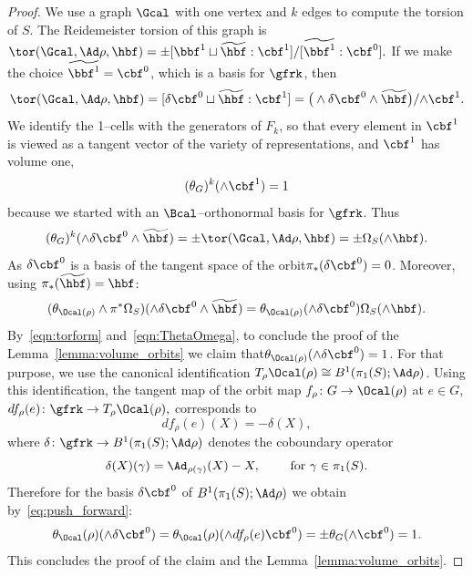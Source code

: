 \begin{proof}
We use a graph $\Gcal$ with one vertex and $k$ edges to compute the torsion of $S$. The Reidemeister torsion of this graph is $
\tor(\Gcal,\Ad\rho, \hbf)= \pm { [{\bbf^1}\sqcup \widetilde{\hbf}: \cbf^1]}/{ [\widetilde{\bbf^1} : \cbf^0] }. $ If we make the choice $\widetilde{\bbf^1}=\cbf^0$, which is a basis for $\gfrk$, then
\[
\tor(\Gcal,\Ad\rho, \hbf)= { [\delta{\cbf^0}\sqcup \widetilde{\hbf}: \cbf^1]} = \big(\wedge\delta{\cbf^0}\wedge \widetilde{\hbf}\big) \slash {\wedge\cbf^1}.
\]
We identify the 1--cells with the generators of $F_k$, so that every element in $\cbf^1$ is viewed as a tangent vector of the variety of representations, and $\cbf^1$ has volume one,
\[
(\theta_G)^{k} (\wedge \cbf^1) = 1
\]
because we started with an $\Bcal$--orthonormal basis for $\gfrk$. Thus
\begin{equation}\label{eqn:torform}
(\theta_G)^{k} (\wedge\delta{\cbf^0}\wedge \widetilde{\hbf})=\pm
\tor(\Gcal,{\Ad\rho, \hbf})= \pm \Omega_S(\wedge \hbf).
\end{equation}
As $\delta\cbf^0$ is a basis of the tangent space of the orbit$\pi_*(\delta\cbf^0)=0$. Moreover, using $\pi_*(\widetilde{\hbf})= \hbf$:
\begin{equation}\label{eqn:ThetaOmega}
(\theta_{\Ocal(\rho)}\wedge \pi^* \Omega_S) (\wedge \delta{\cbf^0}\wedge \widetilde{\hbf}) =
\theta_{\Ocal(\rho)}(\wedge \delta{\cbf^0}) \Omega_S(\wedge \hbf).
\end{equation}
By~\eqref{eqn:torform} and~\eqref{eqn:ThetaOmega}, to conclude the proof of the Lemma~\ref{lemma:volume_orbits} we claim that\linebreak $\theta_{\Ocal(\rho)}(\wedge \delta{\cbf^0})=1$. For that purpose, we use the canonical identification $T_\rho \Ocal(\rho) \cong B^1(\pi_1(S);\Ad\rho)$. Using this identification, the tangent map of the orbit map $f_\rho\colon G\to\Ocal(\rho)$ at $e\in G$, $ df_\rho(e)\colon \gfrk \to T_\rho \Ocal(\rho), $ corresponds to
\[
df_\rho(e)(X) = -\delta(X),
\]
where $\delta\colon \gfrk\to B^1(\pi_1(S);\Ad\rho)$ denotes the coboundary operator
\[
\delta(X) (\gamma) = \Ad_{\rho(\gamma)}(X)-X,\qquad\text{ for }
\gamma\in\pi_1(S).
\]
Therefore for the basis $ \delta\cbf^0$ of $B^1(\pi_1(S);\Ad\rho)$ we obtain by~\eqref{eq:push_forward}:
\begin{equation*}
\theta_{\Ocal}(\rho) (\wedge \delta\cbf^0) =
\theta_{\Ocal}(\rho) (\wedge df_\rho(e)\cbf^0) =
\pm \theta_{G}(\wedge \cbf^0)= 1.
\end{equation*}
This concludes the proof of the claim and the Lemma~\ref{lemma:volume_orbits}.
\end{proof}



